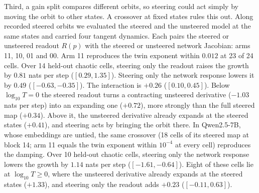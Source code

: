 Third, a gain split compares different orbits, so steering could act simply by moving the orbit to other states. A
crossover at fixed states rules this out. Along recorded steered orbits we evaluated the steered and the unsteered
model at the same states and carried four tangent dynamics. Each pairs the steered or unsteered readout $R(p)$ with the
steered or unsteered network Jacobian: arms 11, 10, 01 and 00. Arm 11 reproduces the twin exponent within $0.012$ at 23
of 24 cells. Over 14 held-out chaotic cells, steering only the readout raises the growth by $0.81$ nats per step
($[0.29,1.35]$). Steering only the network response lowers it by $0.49$ ($[-0.63,-0.35]$). The interaction is $+0.26$
($[0.10,0.45]$). Below $\log_{10}T=0$ the steered readout turns a contracting unsteered derivative ($-1.03$ nats per
step) into an expanding one ($+0.72$), more strongly than the full steered map ($+0.34$). Above it, the unsteered
derivative already expands at the steered states ($+0.41$), and steering acts by bringing the orbit there. In
Qwen2.5-7B, whose embeddings are untied, the same crossover (18 cells of its steered map at block 14; arm 11 equals the
twin exponent within $10^{-4}$ at every cell) reproduces the damping. Over 10 held-out chaotic cells, steering only the
network response lowers the growth by $1.14$ nats per step ($[-1.61,-0.64]$). Eight of these cells lie at
$\log_{10}T\ge0$, where the unsteered derivative already expands at the steered states ($+1.33$), and steering only the
readout adds $+0.23$ ($[-0.11,0.63]$).

